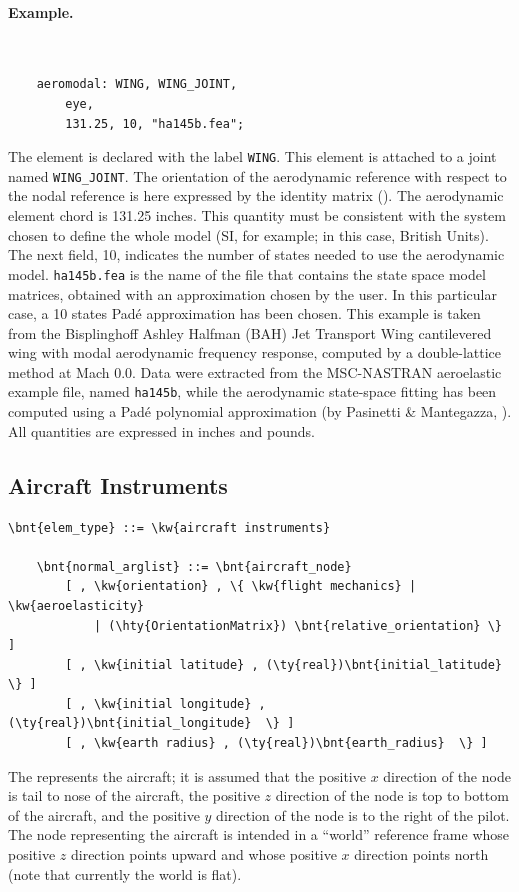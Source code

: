\paragraph{Example.} \
\begin{verbatim}
    aeromodal: WING, WING_JOINT,
        eye,
        131.25, 10, "ha145b.fea";
\end{verbatim}
The  element is declared with the label \texttt{WING}.
This element is attached to a \kw{modal} joint
named \texttt{WING\_JOINT}.
The orientation of the aerodynamic reference with respect
to the nodal reference is here expressed by the identity matrix ().
The aerodynamic element chord is 131.25 inches.
This quantity must be consistent with the system chosen to define
the whole model (SI, for example; in this case, British Units).
The next field, 10, indicates the number of states needed to use
the aerodynamic model.
\texttt{ha145b.fea} is the name of the file that contains
the state space model matrices, obtained with an approximation
chosen by the user.
In this particular case, a 10 states Pad\'e approximation
has been chosen.
This example is taken from the Bisplinghoff Ashley Halfman
(BAH) Jet Transport Wing cantilevered wing with modal aerodynamic
frequency response, computed by a double-lattice method at Mach 0.0.
Data were extracted from the MSC-NASTRAN aeroelastic example file,
named \texttt{ha145b}, while the aerodynamic state-space fitting
has been computed using a Pad\'e polynomial approximation
(by Pasinetti \& Mantegazza, \cite{PASINETTI-MANTEGAZZA-1999}).
All quantities are expressed in inches and pounds.



\subsection{Aircraft Instruments}\label{sec:EL:AERO:AIRCRAFTINSTRUMENTS}
\begin{Verbatim}[commandchars=\\\{\}]
    \bnt{elem_type} ::= \kw{aircraft instruments}

    \bnt{normal_arglist} ::= \bnt{aircraft_node}
        [ , \kw{orientation} , \{ \kw{flight mechanics} | \kw{aeroelasticity}
            | (\hty{OrientationMatrix}) \bnt{relative_orientation} \} ]
	    [ , \kw{initial latitude} , (\ty{real})\bnt{initial_latitude}  \} ]
	    [ , \kw{initial longitude} , (\ty{real})\bnt{initial_longitude}  \} ]
	    [ , \kw{earth radius} , (\ty{real})\bnt{earth_radius}  \} ]
\end{Verbatim}
The  represents the aircraft; it is assumed
that the positive $x$ direction of the node is tail to nose of the aircraft,
the positive $z$ direction of the node is top to bottom of the aircraft,
and the positive $y$ direction of the node is to the right of the pilot.
The node representing the aircraft is intended in a ``world''
reference frame whose positive $z$ direction points upward
and whose positive $x$ direction points north
(note that currently the world is flat).

